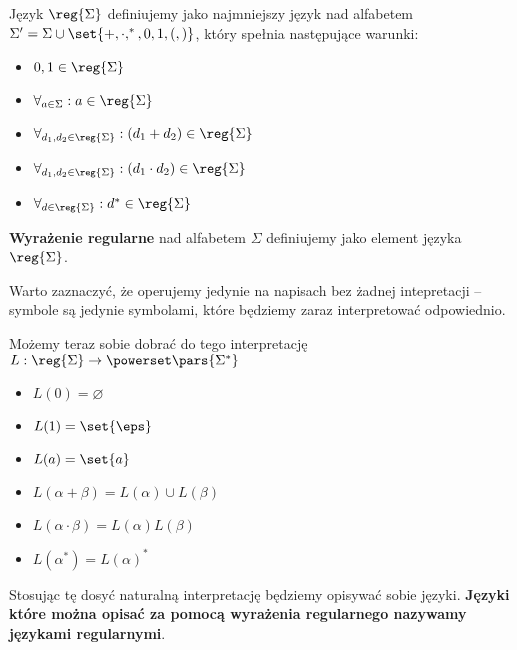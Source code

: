 \begin{definition}
    Język \( \reg{\Sigma} \) definiujemy jako najmniejszy język nad alfabetem \( \Sigma' = \Sigma \cup \set{+, \cdot, ^*, 0, 1, (, )} \), który spełnia następujące warunki:
    
       \begin{itemize}
        \item \( 0, 1 \in \reg{\Sigma} \)
        \item \( \forall_{a \in \Sigma}: a \in \reg{\Sigma} \)
        \item \( \forall_{d_1, d_2 \in \reg{\Sigma}}: (d_1 + d_2) \in \reg{\Sigma} \)
        \item \( \forall_{d_1, d_2 \in \reg{\Sigma}}: (d_1 \cdot d_2) \in \reg{\Sigma} \)
        \item \( \forall_{d \in \reg{\Sigma}}: d^* \in \reg{\Sigma} \)
    \end{itemize}
\end{definition}

\begin{definition}
    \textbf{Wyrażenie regularne} nad alfabetem \( \Sigma \) definiujemy jako element języka  \( \reg{\Sigma} \).
    
\end{definition}

Warto zaznaczyć, że operujemy jedynie na napisach bez żadnej intepretacji -- symbole są jedynie symbolami, które będziemy zaraz interpretować odpowiednio.

Możemy teraz sobie dobrać do tego interpretację \( L: \reg{\Sigma} \rightarrow \powerset\pars{\Sigma^*} \)
\begin{itemize}
    \item \( L(0) = \varnothing \)
    \item \( L(1) = \set{\eps} \)
    \item \( L(a) = \set{a} \)
    \item \( L(\alpha + \beta) = L(\alpha) \cup L(\beta) \)
    \item \( L(\alpha \cdot \beta) = L(\alpha)L(\beta) \)
    \item \( L(\alpha^*) = L(\alpha)^* \)
\end{itemize}

Stosując tę dosyć naturalną interpretację będziemy opisywać sobie języki. \textbf{Języki które można opisać za pomocą wyrażenia regularnego nazywamy językami regularnymi}.
